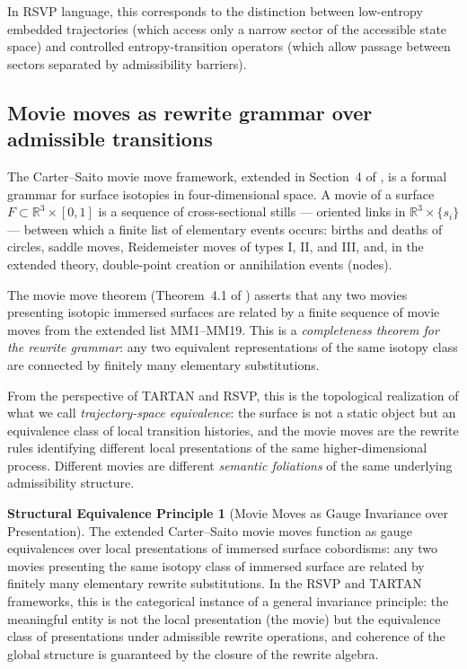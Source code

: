 \documentclass[12pt, a4paper]{article}
\theoremstyle{plain}
\theoremstyle{definition}
\theoremstyle{correspondence}
\newtheorem{strucprin}[theorem]{Structural Equivalence Principle}
\newcommand{\RR}{\mathbb{R}}
\begin{document}
In RSVP language, this corresponds to the distinction between low-entropy embedded
trajectories (which access only a narrow sector of the accessible state space) and
controlled entropy-transition operators (which allow passage between sectors separated
by admissibility barriers).

\subsection{Movie moves as rewrite grammar over admissible transitions}

The Carter--Saito movie move framework, extended in Section~4 of \cite{CCKK25}, is a
formal grammar for surface isotopies in four-dimensional space. A movie of a surface
$F \subset \RR^3 \times [0,1]$ is a sequence of cross-sectional stills --- oriented
links in $\RR^3 \times \{s_i\}$ --- between which a finite list of elementary events
occurs: births and deaths of circles, saddle moves, Reidemeister moves of types I, II,
and III, and, in the extended theory, double-point creation or annihilation events
(nodes).

The movie move theorem (Theorem~4.1 of \cite{CCKK25}) asserts that any two movies
presenting isotopic immersed surfaces are related by a finite sequence of movie moves
from the extended list MM1--MM19. This is a \emph{completeness theorem for the rewrite
grammar}: any two equivalent representations of the same isotopy class are connected
by finitely many elementary substitutions.

From the perspective of TARTAN and RSVP, this is the topological realization of what
we call \emph{trajectory-space equivalence}: the surface is not a static object but an
equivalence class of local transition histories, and the movie moves are the rewrite
rules identifying different local presentations of the same higher-dimensional process.
Different movies are different \emph{semantic foliations} of the same underlying
admissibility structure.

\begin{strucprin}[Movie Moves as Gauge Invariance over Presentation]
\label{sp:movies}
The extended Carter--Saito movie moves function as gauge equivalences over local
presentations of immersed surface cobordisms: any two movies presenting the same
isotopy class of immersed surface are related by finitely many elementary rewrite
substitutions. In the RSVP and TARTAN frameworks, this is the categorical instance
of a general invariance principle: the meaningful entity is not the local presentation
(the movie) but the equivalence class of presentations under admissible rewrite
operations, and coherence of the global structure is guaranteed by the closure of
the rewrite algebra.
\end{strucprin}
\end{document}
